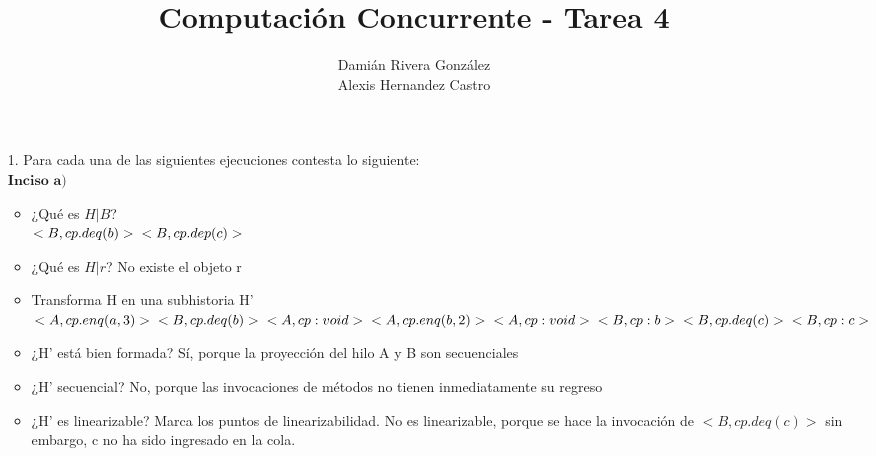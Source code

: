 \documentclass[12pt, letterpaper]{article}
\title{Computación Concurrente - Tarea 4}
\author{Damián Rivera González\\Alexis Hernandez Castro}
\begin{document}
\maketitle

\begin{itemize}
\item[1.] Para cada una de las siguientes ejecuciones contesta lo siguiente: \\
$\textbf{Inciso a)}$
\begin{itemize}
\item ¿Qué es $H|B$?\\
$<B, cp.deq(b)>\\
<B, cp.dep(c)>$
\item ¿Qué es $H|r$?
No existe el objeto r
\item Transforma H en una subhistoria H'\\
$<A, cp.enq(a,3)>\\
<B, cp.deq(b)>\\
<A, cp:void>\\
<A, cp.enq(b,2)>\\
<A, cp:void>\\
<B, cp:b>\\
<B, cp.deq(c)>\\
<B, cp:c>$
\item ¿H' está bien formada?
Sí, porque la proyección del hilo A y B son secuenciales
\item ¿H' secuencial?
No, porque las invocaciones de métodos no tienen inmediatamente su regreso
\item ¿H' es linearizable? Marca los puntos de linearizabilidad.
No es linearizable, porque se hace la invocación de $<B, cp.deq(c)>$ sin embargo, c no ha sido ingresado en la cola.
\end{itemize}


\end{itemize}
\end{document}
